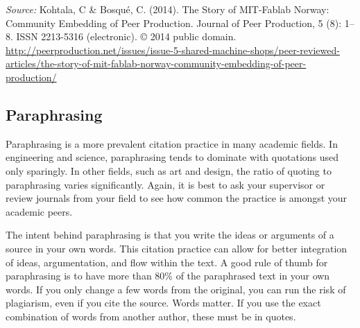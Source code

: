 \documentclass[english, 12pt, a4paper, elec, utf8, a-2b, online]{aaltothesis}
\begin{document}
\vspace{1ex}
{\centering
{}
}

\vspace{1ex}
\noindent
\textit{Source:} Kohtala, C \& Bosqu\'e, C. (2014). The Story of MIT-Fablab 
Norway: Community Embedding of Peer Production. Journal of Peer Production, 
5 (8): 1--8. ISSN 2213-5316 (electronic). \copyright{} 2014 public domain.  \url{http://peerproduction.net/issues/issue-5-shared-machine-shops/peer-reviewed-articles/the-story-of-mit-fablab-norway-community-embedding-of-peer-production/}


\subsection*{Paraphrasing}

Paraphrasing is a more prevalent citation practice in many academic fields. In 
engineering and science, paraphrasing tends to dominate with quotations used 
only sparingly. In other fields, such as art and design, the ratio of quoting to
paraphrasing varies significantly. Again, it is best to ask your supervisor or 
review journals from your field to see how common the practice is amongst your 
academic peers.

The intent behind paraphrasing is that you write the ideas or arguments of a 
source in your own words. This citation practice can allow for better 
integration of ideas, argumentation, and flow within the text. A good rule of 
thumb for paraphrasing is to have more than 80\% of the paraphrased text in your
own words. If you only change a few words from the original, you can run the 
risk of plagiarism, even if you cite the source. Words matter. If you use the 
exact combination of words from another author, these must be in quotes.
\end{document}
